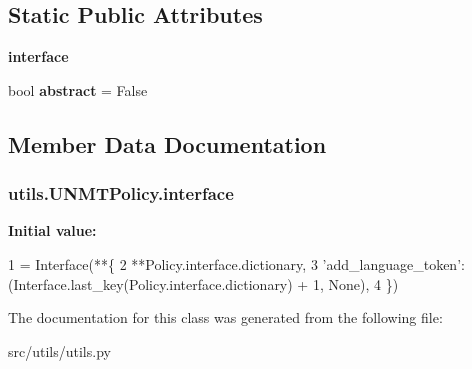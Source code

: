 \subsection*{Static Public Attributes}
\begin{DoxyCompactItemize}
\item 
{\bfseries interface}
\item 
bool {\bfseries abstract} = False\hypertarget{classutils_1_1UNMTPolicy_a57bef07dc42f2b80ccc8fb1a1860fc47}{}\label{classutils_1_1UNMTPolicy_a57bef07dc42f2b80ccc8fb1a1860fc47}

\end{DoxyCompactItemize}


\subsection{Member Data Documentation}
\subsubsection[{\texorpdfstring{interface}{interface}}]{\setlength{\rightskip}{0pt plus 5cm}utils.\+U\+N\+M\+T\+Policy.\+interface\hspace{0.3cm}{\ttfamily [static]}}\hypertarget{classutils_1_1UNMTPolicy_aeb3df2eb6c8c25f7c429e2b393028036}{}\label{classutils_1_1UNMTPolicy_aeb3df2eb6c8c25f7c429e2b393028036}
{\bfseries Initial value\+:}
\begin{DoxyCode}
1 = Interface(**\{
2         **Policy.interface.dictionary,
3         \textcolor{stringliteral}{'add\_language\_token'}: (Interface.last\_key(Policy.interface.dictionary) + 1, \textcolor{keywordtype}{None}),
4     \})
\end{DoxyCode}


The documentation for this class was generated from the following file\+:\begin{DoxyCompactItemize}
\item 
src/utils/utils.\+py\end{DoxyCompactItemize}
